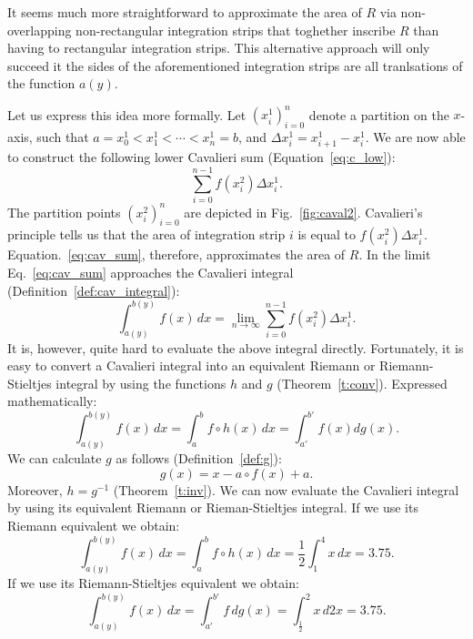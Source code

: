 \documentclass[twoside,reqno,11pt]{fcaa-var} %
\begin{document}

It seems much more straightforward to approximate the area of $R$ via non-overlapping non-rectangular integration strips that toghether inscribe $R$ than having to 
rectangular integration strips. This alternative approach 
will only succeed it the sides of the aforementioned integration strips are all tranlsations of the function $a(y)$. 

Let us express this idea more formally. Let $(x_i^1)_{i=0}^{n}$ denote a partition on the $x$-axis, such that $a = x_0^1 < x_1^1 < \cdots < x_n^1 = b$, and $\Delta x_i^1 = x_{i+1}^1 - x_i^1$.
We are now able to construct the following lower Cavalieri sum (Equation~\ref{eq:c_low}):
\begin{equation}
\label{eq:cav_sum}
\sum_{i=0}^{n-1} f(x_i^2)\Delta x_i^1.
\end{equation}
The partition points $(x_i^2)_{i=0}^{n}$ are depicted in Fig.~\ref{fig:caval2}. Cavalieri's principle tells us that the area of integration strip $i$ is equal to $f(x_i^2)\Delta x_i^1$. Equation.~\eqref{eq:cav_sum}, therefore, approximates the area of $R$. In the limit Eq.~\eqref{eq:cav_sum} approaches 
the Cavalieri integral (Definition~\ref{def:cav_integral}):
\begin{equation}
\label{eq:caval1}
\int_{a(y)}^{b(y)}f(x)\, dx = \lim_{n\to \infty}\sum_{i=0}^{n-1} f(x_i^2)\Delta x_i^1.
\end{equation}
It is, however, quite hard to evaluate the above integral directly. Fortunately, it is easy to convert a Cavalieri integral into an equivalent Riemann or Riemann-Stieltjes 
integral by using the functions $h$ and $g$ (Theorem~\ref{t:conv}). Expressed mathematically:
\begin{equation}
\label{eq:main_cav}
\int_{a(y)}^{b(y)}f(x)\,dx =\int_a^b f \circ h (x)\, dx = \int_{a'}^{b'} f(x) dg(x).
\end{equation}
We can calculate $g$ as follows (Definition~\ref{def:g}):
\begin{equation}
g(x) = x - a\circ f(x) + a.
\end{equation}
Moreover, $h=g^{-1}$ (Theorem~\ref{t:inv}). We can now evaluate the Cavalieri integral by using its equivalent Riemann or Rieman-Stieltjes integral.
If we use its Riemann equivalent we obtain:
\begin{equation}
\int_{a(y)}^{b(y)}f(x)\, dx = \int_a^b f \circ h (x)\, dx = \dfrac{1}{2}\int_1^4x\, dx = 3.75.  
\end{equation}
If we use its Riemann-Stieltjes equivalent we obtain:
\begin{equation}
\int_{a(y)}^{b(y)}f(x)\, dx = \int_{a'}^{b'} f \, dg(x) = \int_{\frac{1}{2}}^2x\, d2x = 3.75.  
\end{equation}
\end{document}
